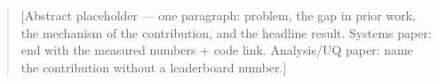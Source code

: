 \begin{abstract}
[Abstract placeholder — one paragraph: problem, the gap in prior work, the mechanism of the contribution,
and the headline result. Systems paper: end with the measured numbers + code link. Analysis/UQ paper:
name the contribution without a leaderboard number.]
\end{abstract}
